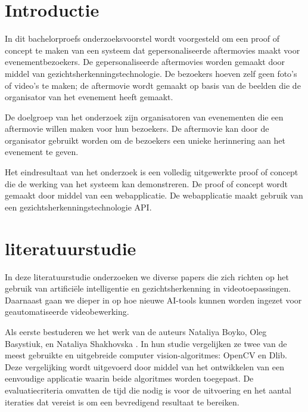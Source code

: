 
\section{Introductie}%
\label{sec:introductie}

In dit bachelorproefs onderzoeksvoorstel wordt voorgesteld om een proof of concept te maken van een systeem dat gepersonaliseerde 
aftermovies maakt voor evenementbezoekers. De gepersonaliseerde aftermovies worden gemaakt door middel van gezichtsherkenningstechnologie.
De bezoekers hoeven zelf geen foto's of video's te maken; de aftermovie wordt gemaakt op basis van de beelden die de organisator van het evenement heeft gemaakt.

De doelgroep van het onderzoek zijn organisatoren van evenementen die een aftermovie willen maken voor hun bezoekers.
De aftermovie kan door de organisator gebruikt worden om de bezoekers een unieke herinnering aan het evenement te geven.

Het eindresultaat van het onderzoek is een volledig uitgewerkte proof of concept die de werking van het systeem kan demonstreren.
De proof of concept wordt gemaakt door middel van een webapplicatie. De webapplicatie maakt gebruik van een gezichtsherkenningstechnologie API.


\section{literatuurstudie}%
\label{sec:state-of-the-art}
In deze literatuurstudie onderzoeken we diverse papers die zich richten op het gebruik van artificiële intelligentie en gezichtsherkenning in videotoepassingen. Daarnaast gaan we dieper in op hoe nieuwe AI-tools kunnen worden ingezet voor geautomatiseerde videobewerking.

Als eerste bestuderen we het werk van de auteurs Nataliya Boyko, Oleg Basystiuk, en Nataliya Shakhovska \autocite{Boyko2018}. In hun studie vergelijken ze twee van de meest gebruikte en uitgebreide computer vision-algoritmes: OpenCV en Dlib. Deze vergelijking wordt uitgevoerd door middel van het ontwikkelen van een eenvoudige applicatie waarin beide algoritmes worden toegepast. De evaluatiecriteria omvatten de tijd die nodig is voor de uitvoering en het aantal iteraties dat vereist is om een bevredigend resultaat te bereiken.

